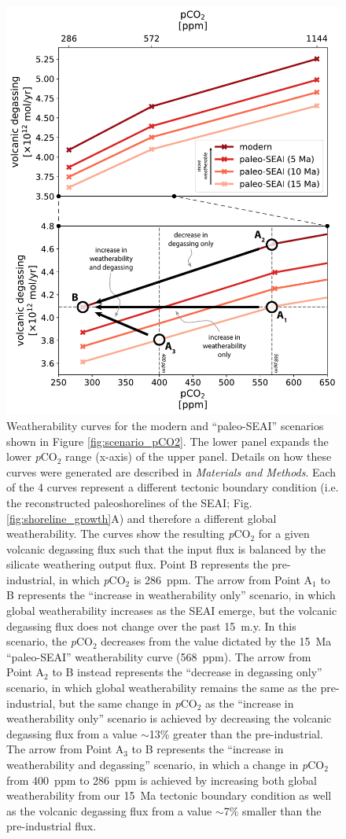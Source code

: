 \documentclass[9pt,twocolumn,twoside,lineno]{pnas-new}
\newcommand{\pCOtwo}{\textit{p}CO$_{2}$\xspace}
\newcommand{\MM}{\textit{Materials and Methods}\xspace}
\begin{document}
\begin{figure}[h!]
    \centering
    \includegraphics[width=1\linewidth]{Figures/weatherability_curves.pdf}
    \caption{Weatherability curves for the modern and ``paleo-SEAI'' scenarios shown in Figure \ref{fig:scenario_pCO2}. The lower panel expands the lower \pCOtwo range (x-axis) of the upper panel. Details on how these curves were generated are described in \MM. Each of the 4 curves represent a different tectonic boundary condition (i.e. the reconstructed paleoshorelines of the SEAI; Fig. \ref{fig:shoreline_growth}A) and therefore a different global weatherability. The curves show the resulting \pCOtwo for a given volcanic degassing flux such that the input flux is balanced by the silicate weathering output flux. Point B represents the pre-industrial, in which \pCOtwo is 286~ppm. The arrow from Point A$_{1}$ to B represents the ``increase in weatherability only'' scenario, in which global weatherability increases as the SEAI emerge, but the volcanic degassing flux does not change over the past 15~m.y. In this scenario, the \pCOtwo decreases from the value dictated by the 15~Ma ``paleo-SEAI'' weatherability curve (568~ppm). The arrow from Point A$_{2}$ to B instead represents the ``decrease in degassing only'' scenario, in which global weatherability remains the same as the pre-industrial, but the same change in \pCOtwo as the ``increase in weatherability only'' scenario is achieved by decreasing the volcanic degassing flux from a value $\sim$13\% greater than the pre-industrial. The arrow from Point A$_{3}$ to B represents the ``increase in weatherability and degassing'' scenario, in which a change in \pCOtwo from 400~ppm to 286~ppm is achieved by increasing both global weatherability from our 15~Ma tectonic boundary condition as well as the volcanic degassing flux from a value $\sim$7\% smaller than the pre-industrial flux.}

\end{figure}
\end{document}
